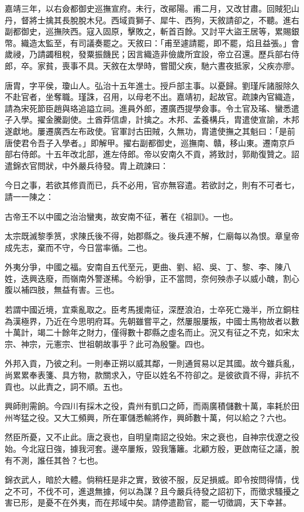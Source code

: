 \begin{pinyinscope}
嘉靖三年，以右僉都御史巡撫宣府。未行，改鄖陽。甫二月，又改甘肅。回賊犯山丹，督將士擒其長脫脫木兒。西域貢獅子、犀牛、西狗，天敘請卻之，不聽。進右副都御史，巡撫陜西。寇入固原，擊敗之，斬首百餘。又討平大盜王居等，累賜銀幣。織造太監至，有司議奏罷之。天敘曰：「甫至遽請罷，即不罷，焰且益張。」會歲祲，乃請蠲租稅，發粟振饑民；因言織造非儉歲所宜設，帝立召還。歷兵部右侍郎，卒。家貧，喪事不具。天敘在太學時，嘗聞父疾，馳六晝夜抵家，父疾亦廖。

唐胄，字平侯，瓊山人。弘治十五年進士。授戶部主事。以憂歸。劉瑾斥諸服除久不赴官者，坐奪職。瑾誅，召用，以母老不出。嘉靖初，起故官。疏諫內官織造，請為宋死節臣趙與珞追謚立祠。進員外郎，遷廣西提學僉事。令土官及瑤、蠻悉遣子入學。擢金騰副使。土酋莽信虐，計擒之。木邦、孟養構兵，胄遣使宣諭，木邦遂獻地。屢遷廣西左布政使。官軍討古田賊，久無功，胄遣使撫之其魁曰：「是前唐使君令吾子入學者。」即解甲。擢右副都御史，巡撫南、贛，移山東。遷南京戶部右侍郎。十五年改北部，進左侍郎。帝以安南久不貢，將致討，郭勛復贊之。詔遣錦衣官問狀，中外嚴兵待發。胄上疏諫曰：

今日之事，若欲其修貢而已，兵不必用，官亦無容遣。若欲討之，則有不可者七，請一一陳之：

古帝王不以中國之治治蠻夷，故安南不征，著在《祖訓》。一也。

太宗既滅黎季筼，求陳氏後不得，始郡縣之。後兵連不解，仁廟每以為恨。章皇帝成先志，棄而不守，今日當率循。二也。

外夷分爭，中國之福。安南自五代至元，更曲、劉、紹、吳、丁、黎、李、陳八姓，迭興迭廢，而嶺南外警遂稀。今紛爭，正不當問，奈何殃赤子以威小醜，割心腹以補四肢，無益有害。三也。

若謂中國近境，宜乘亂取之。臣考馬援南征，深歷浪泊，士卒死亡幾半，所立銅柱為漢極界，乃近在今思明府耳。先朝雖嘗平之，然屢服屢叛，中國士馬物故者以數十萬計，竭二十餘年之財力，僅得數十郡縣之虛名而止。況又有征之不克，如宋太宗、神宗，元憲宗、世祖朝故事乎？此可為殷鑒。四也。

外邦入貢，乃彼之利。一則奉正朔以威其鄰，一則通貿易以足其國。故今雖兵亂，尚累累奉表箋、具方物，款關求入，守臣以姓名不符卻之。是彼欲貢不得，非抗不貢也。以此責之，詞不順。五也。

興師則需餉。今四川有採木之役，貴州有凱口之師，而兩廣積儲數十萬，率耗於田州岑猛之役。又大工頻興，所在軍儲悉輸將作，興師數十萬，何以給之？六也。

然臣所憂，又不止此。唐之衰也，自明皇南詔之役始。宋之衰也，自神宗伐遼之役始。今北寇日強，據我河套。邊卒屢叛，毀我籓籬。北顧方殷，更啟南征之議，脫有不測，誰任其咎？七也。

錦衣武人，暗於大體。倘稍枉是非之實，致彼不服，反足損威。即令按問得情，伐之不可，不伐不可，進退無據，何以為謀？且今嚴兵待發之詔初下，而徵求騷擾之害已形，是憂不在外夷，而在邦域中矣。請停遣勘官，罷一切徵調，天下幸甚。


\end{pinyinscope}
